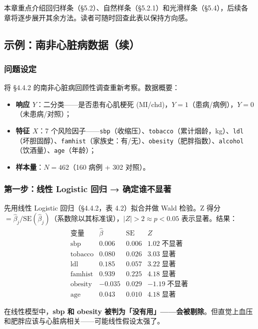 本章重点介绍回归样条（§5.2）、自然样条（§5.2.1）和光滑样条（§5.4），后续各章将逐步展开其余方法。读者可随时回查此表以保持方向感。

\subsection{示例：南非心脏病数据（续）}

\subsubsection{问题设定}

将 §4.4.2 的南非心脏病回顾性调查重新考察。数据概要：
\begin{itemize}
    \item \textbf{响应 $Y$}：二分类——是否患有心肌梗死 (MI/chd)，$Y=1$（患病/病例），$Y=0$（未患病/对照）；
    \item \textbf{特征 $X$}：7 个风险因子——\texttt{sbp}（收缩压）、\texttt{tobacco}（累计烟龄，kg）、\texttt{ldl}（坏胆固醇）、\texttt{famhist}（家族史：有/无）、\texttt{obesity}（肥胖指数）、\texttt{alcohol}（饮酒量）、\texttt{age}（年龄）；
    \item \textbf{样本量}：$N=462$（160 病例 + 302 对照）。
\end{itemize}

\subsubsection{第一步：线性 Logistic 回归 → 确定谁不显著}

先用线性 Logistic 回归（§4.4.2，表 4.2）拟合并做 Wald 检验。Z 得分 $= \hat{\beta}_j / \text{SE}(\hat{\beta}_j)$（系数除以其标准误），$\vert Z\vert > 2 \approx p<0.05$ 表示显著。结果：
\[
\begin{array}{c|c|c|c}
\text{变量} & \hat{\beta} & \text{SE} & Z \\ \hline
\text{sbp} & 0.006 & 0.006 & 1.02\;\text{不显著} \\
\text{tobacco} & 0.080 & 0.026 & 3.03\;\text{显著} \\
\text{ldl} & 0.185 & 0.057 & 3.22\;\text{显著} \\
\text{famhist} & 0.939 & 0.225 & 4.18\;\text{显著} \\
\text{obesity} & -0.035 & 0.029 & -1.19\;\text{不显著} \\
\text{age} & 0.043 & 0.010 & 4.18\;\text{显著}
\end{array}
\]

在线性模型中，\textbf{sbp 和 obesity 被判为「没有用」——会被剔除}。但直觉上血压和肥胖应该与心脏病相关——可能线性假设太强了。

